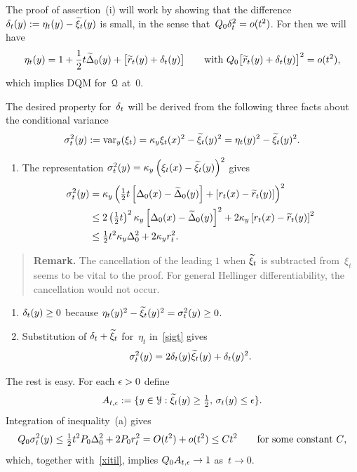 \documentclass[aos]{imsart}
\theoremstyle{plain}
\theoremstyle{remark}
\newenvironment{remark}{\begin{quote}{\bf Remark.\quad}\rm\small}{\end{quote}}
\def\Remark{\begin{remark}}
\def\endRemark{\end{remark}}
\begin{document}
The proof of assertion~(i) will work by showing that the difference $\delta_t(y) := \eta_t(y)-\widetilde\xi_t(y)$ is small, in the sense that~$Q_0\delta_t^2=o(t^2)$. For then we will have
$$
\eta_t(y) = 
1 +\frac12 t \widetilde\Delta_0(y) +\bigl[\widetilde r_t(y) +\delta_t(y)\bigr]
\qquad\hbox{\rm with }Q_0\bigl[\widetilde r_t(y) +\delta_t(y)\bigr]^2=o(t^2),
$$
which implies DQM for~${\EuScript Q}$ at~$0$.


The desired property for~$\delta_t$ will be derived from the following three facts about the conditional variance
\begin{equation}
\sigma_t^2(y) := \hbox{\rm var}_y(\xi_t) = \kappa_y \xi_t(x)^2 - \widetilde\xi_t(y)^2= \eta_t(y)^2 - \widetilde\xi_t(y)^2.
\label{sigt}
\end{equation}
\begin{enumerate} 
\item[(a)]
The  representation $\sigma_t^2(y) =\kappa_y\left(\xi_t(x)-\widetilde\xi_t(y)\right)^2$ gives
\begin{align*}
\sigma_t^2(y)
&= \kappa_y\left(\tfrac12 t\left[\Delta_0(x)-\widetilde\Delta_0(y)\right] +\left[r_t(x)-\widetilde r_t(y)\right]\right)^2
\notag\\
&\le 2\left(\tfrac12 t\right)^2\kappa_y\left[\Delta_0(x)-\widetilde\Delta_0(y)\right] ^2 + 2\kappa_y\left[r_t(x)-\widetilde r_t(y)\right]^2
\notag\\
&\le \tfrac12 t^2 \kappa_y\Delta_0^2 + 2\kappa_y r_t^2   .
\end{align*}
\end{enumerate} 

\Remark 
The cancellation of the leading $1$ when $\widetilde\xi_t$ is subtracted from~$\xi_t$ seems to
be vital to the proof. For general Hellinger differentiability, the cancellation would not occur.
\endRemark

\begin{enumerate} 

\item[(b)]
 $\delta_t(y) \ge 0$ because
 $\eta_t(y)^2-\widetilde\xi_t(y)^2 =\sigma_t^2(y)\ge0$.
\smallskip
\item[(c)]
Substitution of $\delta_t+\widetilde\xi_t$ for~$\eta_t$ in~\cref{sigt} gives
$$
\sigma_t^2(y) = 2\delta_t(y)\widetilde\xi_t(y) + \delta_t(y)^2 .
$$
\end{enumerate} 

The rest is easy.
For each $\epsilon>0$ define
$$
A_{t,\epsilon} :=\{y\in {\EuScript Y}: \widetilde\xi_t(y) \ge\tfrac12,\, \sigma_t(y) \le \epsilon\}.
$$
Integration of inequality~(a) gives
$$
Q_0 \sigma_t^2(y) \le \tfrac12 t^2 P_0\Delta_0^2 + 2P_0r_t^2 = O(t^2)+o(t^2)\le Ct^2
\qquad\hbox{\rm for some constant $C$},
$$
which, together with~\cref{xitil}, implies $Q_0A_{t,\epsilon}\to1$ as~$t\to0$.
\end{document}
